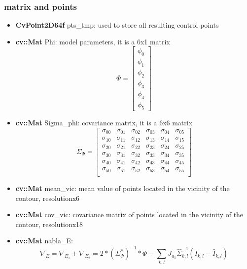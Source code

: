 \documentclass[11pt]{article}
\begin{document}
\subsubsection{matrix and points}
\label{sec-1_1_2}
\begin{itemize}

\item \textbf{CvPoint2D64f} pts\_tmp: used to store all resulting control points\\
\label{sec-1_1_2_1}%
\item \textbf{cv::Mat} Phi: model parameters, it is a 6x1 matrix
\label{sec-1_1_2_2}%
\begin{displaymath}
\Phi =
\left[ {\begin{array}{c}
\phi_0 \\
\phi_1 \\
\phi_2 \\
\phi_3 \\
\phi_4 \\
\phi_5
 \end{array} } \right]
\end{displaymath}

\item \textbf{cv::Mat} Sigma\_phi: covariance matrix, it is a 6x6 matrix
\label{sec-1_1_2_3}%
\begin{displaymath}
\Sigma_{\Phi} =
\left[ {\begin{array}{cccccc}
\sigma_{00} & \sigma_{01} & \sigma_{02} & \sigma_{03} & \sigma_{04} &
\sigma_{05}\\
\sigma_{10} & \sigma_{11} & \sigma_{12} & \sigma_{13} & \sigma_{14} &
\sigma_{15}\\
\sigma_{20} & \sigma_{21} & \sigma_{22} & \sigma_{23} & \sigma_{24} &
\sigma_{25}\\
\sigma_{30} & \sigma_{31} & \sigma_{32} & \sigma_{33} & \sigma_{34} &
\sigma_{35}\\
\sigma_{40} & \sigma_{41} & \sigma_{42} & \sigma_{43} & \sigma_{44} &
\sigma_{45}\\
\sigma_{50} & \sigma_{51} & \sigma_{52} & \sigma_{53} & \sigma_{54} &
\sigma_{55}\\
 \end{array} } \right]
\end{displaymath}

\item \textbf{cv::Mat} mean\_vic: mean value of points located in the vicinity of the contour, resolutionx6\\
\label{sec-1_1_2_4}%
\item \textbf{cv::Mat} cov\_vic: covariance matrix of points located in the vicinity of the contour, resolutionx18\\
\label{sec-1_1_2_5}%
\item \textbf{cv::Mat} nabla\_E:
\label{sec-1_1_2_6}%
\begin{displaymath}
\nabla_E = \nabla_{E_1} + \nabla_{E_2}
         = 2*(\Sigma_\Phi^*)^{-1}*\Phi
         - \sum_{k,l}J_{a_1} \hat{\Sigma}_{k,l}^{-1} (I_{k,l} - \hat{I}_{k,l})
\end{displaymath}


\end{itemize}
\end{document}
